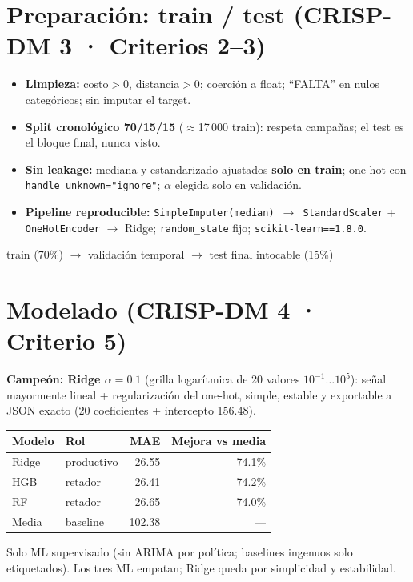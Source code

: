 \documentclass[11pt]{article}
\begin{document}
\section{Preparación: train / test (CRISP-DM 3 · Criterios 2--3)}
\begin{itemize}[leftmargin=*]
\item \textbf{Limpieza:} costo$>0$, distancia$>0$; coerción a float; ``FALTA'' en nulos categóricos; sin imputar el target.
\item \textbf{Split cronológico 70/15/15} ($\approx$17\,000 train): respeta campañas; el test es el bloque final, nunca visto.
\item \textbf{Sin leakage:} mediana y estandarizado ajustados \textbf{solo en train}; one-hot con \texttt{handle\_unknown="ignore"}; $\alpha$ elegida solo en validación.
\item \textbf{Pipeline reproducible:} \texttt{SimpleImputer(median) $\to$ StandardScaler} + \texttt{OneHotEncoder} $\to$ Ridge; \texttt{random\_state} fijo; \texttt{scikit-learn==1.8.0}.
\end{itemize}
\begin{center}\begin{kpi}train (70\%) $\to$ validación temporal $\to$ test final intocable (15\%)\end{kpi}\end{center}
\section{Modelado (CRISP-DM 4 · Criterio 5)}
\textbf{Campeón: Ridge $\alpha{=}0.1$} (grilla logarítmica de 20 valores
$10^{-1}\dots10^{5}$): señal mayormente lineal + regularización del one-hot,
simple, estable y exportable a JSON exacto (20 coeficientes + intercepto 156.48).
\begin{center}
{\small
\begin{tabular}{llrr}
\toprule Modelo & Rol & MAE & Mejora vs media \\
\midrule Ridge & productivo & 26.55 & 74.1\% \\
HGB & retador & 26.41 & 74.2\% \\
RF & retador & 26.65 & 74.0\% \\
Media & baseline & 102.38 & --- \\
\bottomrule
\end{tabular}}
\end{center}
Solo ML supervisado (sin ARIMA por política; baselines ingenuos solo etiquetados).
Los tres ML empatan; Ridge queda por simplicidad y estabilidad.
\end{document}
